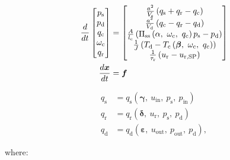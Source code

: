 \begin{equation} 
  \begin{split}
    \dt{} \begin{bmatrix}
      p_\text{s}\\
      p_\text{d}\\
      q_\text{c}\\
      \omega_\text{c}\\
      q_\text{r}
    \end{bmatrix} & = 
    \begin{bmatrix}
      \frac{a^2}{V_\text{s}}\left(q_\text{s}+q_\text{r}-q_\text{c}\right)\\
      \frac{a^2}{V_\text{d}}\left(q_\text{c}-q_\text{r}-q_\text{d}\right)\\
      \frac{A}{l_\text{c}}\left(\Pi_{\text{ss}}\left(\alpha,\ \omega_\text{c},\ q_\text{c} \right)p_\text{s} - p_\text{d}  \right)\\
      \frac{1}{J}\left(T_\text{d} - T_\text{c}\left(\bm{\beta},\ \omega_\text{c},\ q_\text{c}\right)\right)\\
      \frac{1}{\tau_\text{r}}\left(u_\text{r} - u_{\text{r,SP}}\right)
    \end{bmatrix} \\
    \dt{\bm{x}} & = \bm{f}
  \end{split}
  \label{eq:mod:single_comp_states}
\end{equation}    

\begin{equation}
  \begin{split}
    q_\text{s} & = q_\text{s}(\bm{\gamma},\ u_{\text{in}},\ p_\text{s},\ p_{\text{in}})\\
    q_\text{r} & = q_\text{r}(\bm{\delta},\ u_\text{r},\ p_\text{s},\ p_\text{d})\\
    q_\text{d} & = q_\text{d}(\bm{\varepsilon},\ u_{\text{out}},\ p_{\text{out}},\ p_\text{d}),
  \end{split}
\end{equation}


where:

